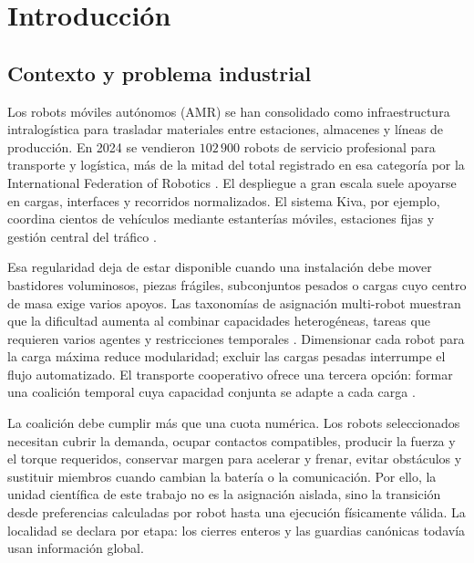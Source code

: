 \section{Introducción}

\subsection{Contexto y problema industrial}

Los robots móviles autónomos (AMR) se han consolidado como infraestructura intralogística para trasladar materiales entre estaciones, almacenes y líneas de producción. En 2024 se vendieron $102\,900$ robots de servicio profesional para transporte y logística, más de la mitad del total registrado en esa categoría por la International Federation of Robotics \citep{ifr2025service}. El despliegue a gran escala suele apoyarse en cargas, interfaces y recorridos normalizados. El sistema Kiva, por ejemplo, coordina cientos de vehículos mediante estanterías móviles, estaciones fijas y gestión central del tráfico \citep{wurman2008coordinating}.

Esa regularidad deja de estar disponible cuando una instalación debe mover bastidores voluminosos, piezas frágiles, subconjuntos pesados o cargas cuyo centro de masa exige varios apoyos. Las taxonomías de asignación multi-robot muestran que la dificultad aumenta al combinar capacidades heterogéneas, tareas que requieren varios agentes y restricciones temporales \citep{gerkey2004formal,korsah2013taxonomy}. Dimensionar cada robot para la carga máxima reduce modularidad; excluir las cargas pesadas interrumpe el flujo automatizado. El transporte cooperativo ofrece una tercera opción: formar una coalición temporal cuya capacidad conjunta se adapte a cada carga \citep{tuci2018cooperative,an2023cooperative,dutta2021hedonic,zhang2024coalition}.

La coalición debe cumplir más que una cuota numérica. Los robots seleccionados necesitan cubrir la demanda, ocupar contactos compatibles, producir la fuerza y el torque requeridos, conservar margen para acelerar y frenar, evitar obstáculos y sustituir miembros cuando cambian la batería o la comunicación. Por ello, la unidad científica de este trabajo no es la asignación aislada, sino la transición desde preferencias calculadas por robot hasta una ejecución físicamente válida. La localidad se declara por etapa: los cierres enteros y las guardias canónicas todavía usan información global.





